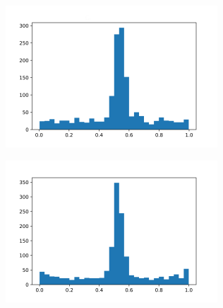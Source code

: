\documentclass[12pt,twoside]{report}
\begin{document}
\begin{center}
\begin{minipage}{0.45\linewidth}
\includegraphics[width=\linewidth]{figures/hist.png}
\end{minipage}%
\hfill
\begin{minipage}{0.45\linewidth}
\includegraphics[width=\linewidth]{figures/hist3.png}
\end{minipage}
\end{center}
\end{document}
